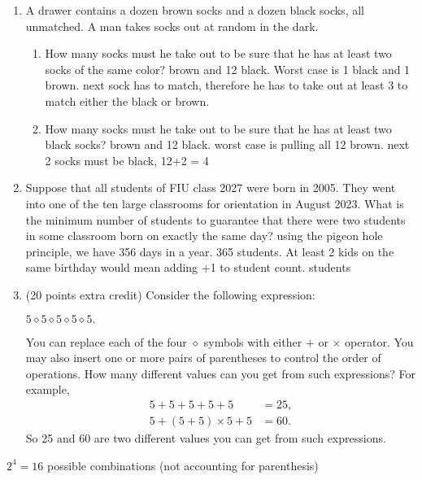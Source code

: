 \documentclass{article}
\begin{document}
\begin{enumerate}
		\item A drawer contains a dozen brown socks and a dozen black socks, all unmatched. A man takes socks out at random in the dark.
		\begin{enumerate}
			\item How many socks must he take out to be sure that he has at least two socks of the same color?
			 brown and 12 black. Worst case is 1 black and 1 brown.
			\subitem next sock has to match, therefore he has to take out at least 3 to match either the black or brown.
			\item How many socks must he take out to be sure that he has at least two black socks?
			 brown and 12 black. worst case is pulling all 12 brown. 
			\subitem next 2 socks must be black, 12+2 = 4
			
		\end{enumerate}
		
		\item Suppose that all students of FIU class 2027 were born in 2005. They went into one of the ten large classrooms for orientation in August 2023. What is the minimum number of students to guarantee that there were two students in some classroom born on exactly the same day?
		\subitem using the pigeon hole principle, we have 356 days in a year. 365 students. At least 2 kids on the same birthday would mean adding +1 to student count.
		 students
		
		\item (20 points extra credit) Consider the following expression:
		\begin{center}
			$5 \diamond 5 \diamond 5 \diamond 5 \diamond 5.$
		\end{center}
		You can replace each of the four $\diamond$ symbols with either $+$ or $\times$ operator. You may also insert one or more pairs of parentheses to control the order of operations. How many different values can you get from such expressions? For example,
		\begin{align*}
			5 + 5 + 5 + 5 + 5 &= 25, \\
			5 + (5 + 5) \times 5 + 5 &= 60.
		\end{align*}
		So 25 and 60 are two different values you can get from such expressions.
	\end{enumerate}
	\subitem $2^4 = 16$ possible combinations (not accounting for parenthesis) 
	
\end{document}
